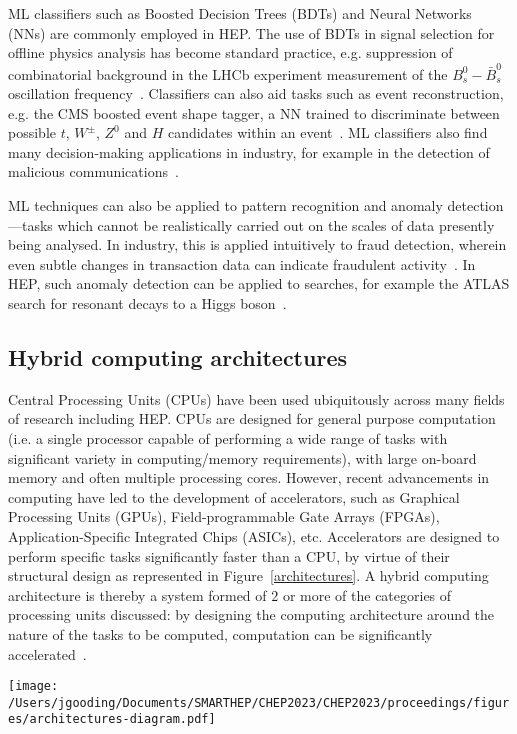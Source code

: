 ML classifiers such as Boosted Decision Trees (BDTs) and Neural Networks (NNs) are commonly employed in HEP. The use of BDTs in signal selection for offline physics analysis has become standard practice, e.g. suppression of combinatorial background in the LHCb experiment measurement of the $B_s^0-\bar{B}_s^0$ oscillation frequency~\cite{delta-ms}. Classifiers can also aid tasks such as event reconstruction, e.g. the CMS boosted event shape tagger, a NN trained to discriminate between possible $t$, $W^\pm$, $Z^0$ and $H$ candidates within an event~\cite{CMS-best}. ML classifiers also find many decision-making applications in industry, for example in the detection of malicious communications~\cite{classifier-phishing}.

ML techniques can also be applied to pattern recognition and anomaly detection—tasks which cannot be realistically carried out on the scales of data presently being analysed. In industry, this is applied intuitively to fraud detection, wherein even subtle changes in transaction  data can indicate fraudulent activity~\cite{fraud-detection}. In HEP, such anomaly detection can be applied to searches, for example the ATLAS search for resonant decays to a Higgs boson~\cite{anomaly-hep}.

\subsection{Hybrid computing architectures}
\label{hybrid-architectures}
Central Processing Units (CPUs) have been used ubiquitously across many fields of research including HEP. CPUs are designed for general purpose computation (i.e. a single processor capable of performing a wide range of tasks with significant variety in computing/memory requirements), with large on-board memory and often multiple processing cores. However, recent advancements in computing have led to the development of accelerators, such as Graphical Processing Units (GPUs), Field-programmable Gate Arrays (FPGAs), Application-Specific Integrated Chips (ASICs), etc. Accelerators are designed to perform specific tasks significantly faster than a CPU, by virtue of their structural design as represented in Figure~\ref{architectures}. A hybrid computing architecture is thereby a system formed of $2$ or more of the categories of processing units discussed: by designing the computing architecture around the nature of the tasks to be computed, computation can be significantly accelerated~\cite{architectures}.

\begin{figure*}[h!]
    \centering
    \texttt{[image: /Users/jgooding/Documents/SMARTHEP/CHEP2023/CHEP2023/proceedings/figures/architectures-diagram.pdf]}
    \caption{Comparison of CPU, GPU and FPGA architectures, illustrated as schematic diagrams. GPUs typically contain a greater proportion of computational resources than CPUs, with these resources subdivided within each multiprocessor to provide better parallel computing performance. FPGAs take a different approach, comprising of many control blocks connected to memory/IO interface and to one another via switches~\cite{architectures}.}
    \label{architectures}
\end{figure*}

